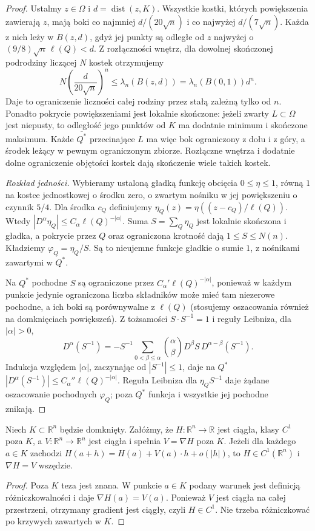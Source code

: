 \begin{proof}
Ustalmy $z\in\Omega$ i $d=\operatorname{dist}(z,K)$.
Wszystkie kostki, których powiększenia zawierają $z$,
mają boki co najmniej $d/(20\sqrt n)$ i co najwyżej
$d/(7\sqrt n)$. Każda z nich leży w $B(z,d)$,
gdyż jej punkty są odległe od $z$ najwyżej
o $(9/8)\sqrt n\,\ell(Q)<d$.
Z rozłączności wnętrz, dla dowolnej skończonej
podrodziny liczącej $N$ kostek otrzymujemy
\[
 N\left(\frac{d}{20\sqrt n}\right)^n
 \le\lambda_n(B(z,d))=\lambda_n(B(0,1))d^n.
\]
Daje to ograniczenie liczności całej rodziny
przez stałą zależną tylko od $n$.
Ponadto pokrycie powiększeniami jest lokalnie
skończone: jeżeli zwarty $L\subset\Omega$ jest
niepusty, to odległość jego punktów od $K$
ma dodatnie minimum i skończone maksimum.
Każde $\overline{Q^*}$ przecinające $L$ ma więc
bok ograniczony z dołu i z góry, a środek leżący
w pewnym ograniczonym zbiorze. Rozłączne wnętrza
i dodatnie dolne ograniczenie objętości kostek
dają skończenie wiele takich kostek.

\emph{Rozkład jedności.}
Wybieramy ustaloną gładką funkcję obcięcia
$0\le\eta\le1$, równą $1$ na kostce jednostkowej
o środku zero, o zwartym nośniku w jej
powiększeniu o czynnik $5/4$. Dla środka $c_Q$
definiujemy $\eta_Q(z)=\eta((z-c_Q)/\ell(Q))$.
Wtedy
$|D^\alpha\eta_Q|\le C_\alpha\ell(Q)^{-|\alpha|}$.
Suma $S=\sum_Q\eta_Q$ jest lokalnie skończona
i gładka, a pokrycie przez $Q$ oraz ograniczona
krotność dają $1\le S\le N(n)$.
Kładziemy $\varphi_Q=\eta_Q/S$.
Są to nieujemne funkcje gładkie o sumie $1$,
z nośnikami zawartymi w $Q^*$.

Na $Q^*$ pochodne $S$ są ograniczone przez
$C_\alpha'\ell(Q)^{-|\alpha|}$, ponieważ w każdym
punkcie jedynie ograniczona liczba składników
może mieć tam niezerowe pochodne, a ich boki
są porównywalne z $\ell(Q)$ (stosujemy oszacowania
również na domknięciach powiększeń).
Z tożsamości $S\cdot S^{-1}=1$ i reguły Leibniza,
dla $|\alpha|>0$,
\[
 D^\alpha(S^{-1})
 =-S^{-1}\sum_{0<\beta\le\alpha}
 \binom{\alpha}{\beta}D^\beta S\,
 D^{\alpha-\beta}(S^{-1}).
\]
Indukcja względem $|\alpha|$, zaczynając od
$|S^{-1}|\le1$, daje na $Q^*$
$|D^\alpha(S^{-1})|\le C_\alpha''\ell(Q)^{-|\alpha|}$.
Reguła Leibniza dla $\eta_Q S^{-1}$ daje żądane
oszacowanie pochodnych $\varphi_Q$; poza $Q^*$
funkcja i wszystkie jej pochodne znikają.
\end{proof}

\begin{lemat}
\label{lem:dzety-glue}
Niech $K\subset\mathbb R^n$ będzie domknięty. Załóżmy, że
$H:\mathbb R^n\to\mathbb R$ jest ciągła, klasy $C^1$ poza $K$,
a $V:\mathbb R^n\to\mathbb R^n$ jest ciągła i spełnia
$V=\nabla H$ poza $K$. Jeżeli dla każdego $a\in K$
zachodzi $H(a+h)=H(a)+V(a)\cdot h+o(|h|)$, to
$H\in C^1(\mathbb R^n)$ i $\nabla H=V$ wszędzie.
\end{lemat}
\begin{proof}
Poza $K$ teza jest znana. W punkcie $a\in K$ podany
warunek jest definicją różniczkowalności i daje
$\nabla H(a)=V(a)$. Ponieważ $V$ jest ciągła na całej
przestrzeni, otrzymany gradient jest ciągły, czyli
$H\in C^1$. Nie trzeba różniczkować po krzywych
zawartych w $K$.
\end{proof}


